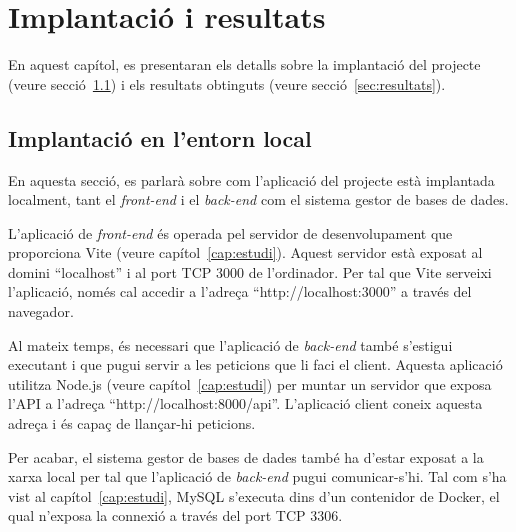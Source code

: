 \documentclass[a4paper,12pt]{ThesisStyle}
\begin{document}
\chapter{Implantació i resultats}
\label{cap:implantacio}

En aquest capítol, es presentaran els detalls sobre la implantació del projecte (veure secció~\ref{sec:implantacio}) i els resultats obtinguts (veure secció~\ref{sec:resultats}).

\section{Implantació en l'entorn local}
\label{sec:implantacio}

En aquesta secció, es parlarà sobre com l'aplicació del projecte està implantada localment, tant el \textit{front-end} i el \textit{back-end} com el sistema gestor de bases de dades.

L'aplicació de \textit{front-end} és operada pel servidor de desenvolupament que proporciona Vite (veure capítol~\ref{cap:estudi}). Aquest servidor està exposat al domini ``localhost'' i al port TCP 3000 de l'ordinador. Per tal que Vite serveixi l'aplicació, només cal accedir a l'adreça ``http://localhost:3000'' a través del navegador.

Al mateix temps, és necessari que l'aplicació de \textit{back-end} també s'estigui executant i que pugui servir a les peticions que li faci el client. Aquesta aplicació utilitza Node.js (veure capítol~\ref{cap:estudi}) per muntar un servidor que exposa l'API a l'adreça ``http://localhost:8000/api''. L'aplicació client coneix aquesta adreça i és capaç de llançar-hi peticions.

Per acabar, el sistema gestor de bases de dades també ha d'estar exposat a la xarxa local per tal que l'aplicació de \textit{back-end} pugui comunicar-s'hi. Tal com s'ha vist al capítol~\ref{cap:estudi}, MySQL s'executa dins d'un contenidor de Docker, el qual n'exposa la connexió a través del port TCP 3306.
\end{document}
